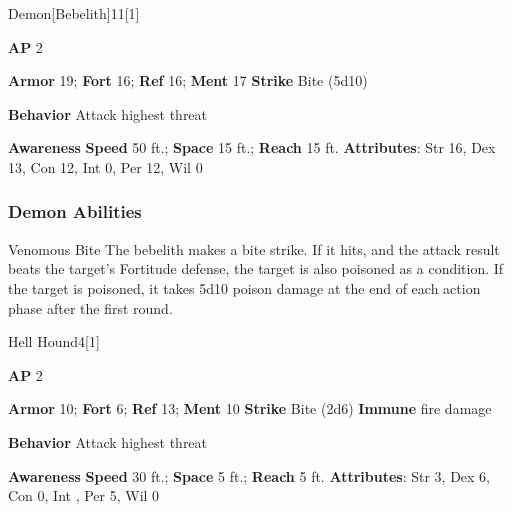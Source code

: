 \begin{monsection}{Demon}[Bebelith]{11}[1]
\vspace{-1em}\vspace{-1em}
\begin{spellcontent}
\begin{spelltargetinginfo}
{\textbf{AP} 2}

\pari \textbf{Armor} 19;
\textbf{Fort} 16;
\textbf{Ref} 16;
\textbf{Ment} 17
\pari \textbf{Strike} Bite  (5d10)



\pari \textbf{Behavior} Attack highest threat
\end{spelltargetinginfo}
\end{spellcontent}

\begin{monsterfooter}
\pari \textbf{Awareness} 
\pari \textbf{Speed} 50 ft.;
\textbf{Space} 15 ft.;
\textbf{Reach} 15 ft.
\pari \textbf{Attributes}:
Str 16,
Dex 13,
Con 12,
Int 0,
Per 12,
Wil 0
\end{monsterfooter}
\end{monsection}


\subsubsection{Demon Abilities}

\begin{freeability}{Venomous Bite}
The bebelith makes a bite strike.
If it hits, and the attack result beats the target's Fortitude defense, the target is also poisoned as a condition.
If the target is poisoned, it takes 5d10 poison damage at the end of each action phase after the first round.
\end{freeability}

\begin{monsection}{Hell Hound}{4}[1]
\vspace{-1em}\vspace{-1em}
\begin{spellcontent}
\begin{spelltargetinginfo}
{\textbf{AP} 2}

\pari \textbf{Armor} 10;
\textbf{Fort} 6;
\textbf{Ref} 13;
\textbf{Ment} 10
\pari \textbf{Strike} Bite  (2d6)
\pari \textbf{Immune} fire damage


\pari \textbf{Behavior} Attack highest threat
\end{spelltargetinginfo}
\end{spellcontent}

\begin{monsterfooter}
\pari \textbf{Awareness} 
\pari \textbf{Speed} 30 ft.;
\textbf{Space} 5 ft.;
\textbf{Reach} 5 ft.
\pari \textbf{Attributes}:
Str 3,
Dex 6,
Con 0,
Int ,
Per 5,
Wil 0
\end{monsterfooter}
\end{monsection}


